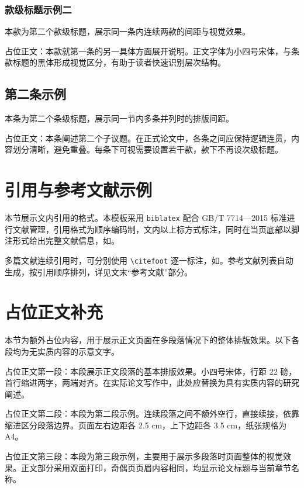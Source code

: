 \subsubsection{款级标题示例二}
本款为第二个款级标题，展示同一条内连续两款的间距与视觉效果。

占位正文：本款就第一条的另一具体方面展开说明。正文字体为小四号宋体，与条款标题的黑体形成视觉区分，有助于读者快速识别层次结构。

\subsection{第二条示例}
本条为第二个条级标题，展示同一节内多条并列时的排版间距。

占位正文：本条阐述第二个子议题。在正式论文中，各条之间应保持逻辑连贯，内容划分清晰，避免重叠。每条下可视需要设置若干款，款下不再设次级标题。

\section{引用与参考文献示例}
本节展示文内引用的格式。本模板采用 \texttt{biblatex} 配合 GB/T 7714—2015 标准进行文献管理，引用格式为顺序编码制，文内以上标方式标注，同时在当页底部以脚注形式给出完整文献信息，如\nocite{ryan2006}。

多篇文献连续引用时，可分别使用 \texttt{\textbackslash citefoot} 逐一标注，如\nocite{deci1999}\nocite{kim2015}。参考文献列表自动生成，按引用顺序排列，详见文末“参考文献”部分。

\section{占位正文补充}
本节为额外占位内容，用于展示正文页面在多段落情况下的整体排版效果。以下各段均为无实质内容的示意文字。

占位正文第一段：本段展示正文段落的基本排版效果。小四号宋体，行距 22 磅，首行缩进两字，两端对齐。在实际论文写作中，此处应替换为具有实质内容的研究阐述。

占位正文第二段：本段为第二段示例。连续段落之间不额外空行，直接续接，依靠缩进区分段落边界。页面左右边距各 2.5 cm，上下边距各 3.5 cm，纸张规格为 A4。

占位正文第三段：本段为第三段示例，主要用于展示多段落时页面整体的视觉效果。正文部分采用双面打印，奇偶页页眉内容相同，均显示论文标题与当前章节名称。
